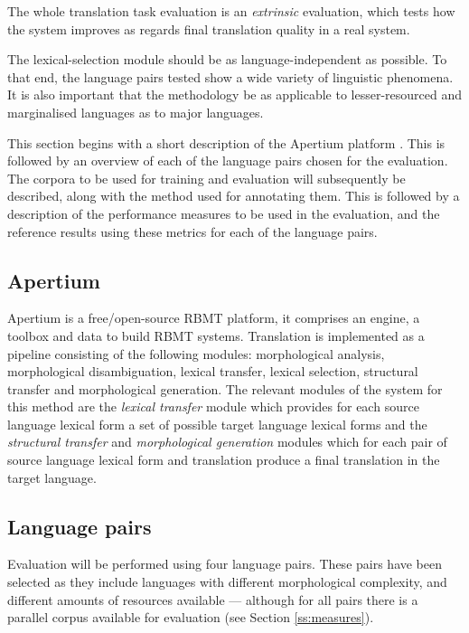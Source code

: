 \documentclass[11pt]{article}
\begin{document}
The
whole translation task evaluation is an \emph{extrinsic} evaluation, which
tests how the system improves as regards final translation
quality in a real system.

The lexical-selection module should be as language-independent as
possible. To that end, the language pairs tested show a wide
variety of linguistic phenomena. It is also important that the
methodology be as applicable to lesser-resourced and marginalised
languages as to major languages.

This section begins with a short description of the Apertium 
platform \citep{forcada2011apertium}. This is followed by 
an overview of each of the language
pairs chosen for the evaluation. The corpora to be used for training
and evaluation will subsequently be described, along with the method
used for annotating them. This is followed by a description of the
performance measures to be used in the evaluation, and the reference
results using these metrics for each of the language pairs.

\subsection{Apertium}
\label{sec:apertium}

Apertium is a free/open-source RBMT platform, it comprises an engine,
a toolbox and data to build RBMT systems. Translation is implemented
as a pipeline consisting of the following modules: morphological
analysis, morphological disambiguation, lexical transfer, lexical
selection, structural transfer and morphological generation. The
relevant modules of the system for this method are the \emph{lexical
  transfer} module which provides for each source language lexical
form a set of possible target language lexical forms and the
\emph{structural transfer} and \emph{morphological generation} modules
which for each pair of source language lexical form and translation
produce a final translation in the target language. 

\subsection{Language pairs}
\label{sec:eval-systems}

Evaluation will be performed using four language pairs. These pairs
have been selected as they include languages with different
morphological complexity, and different amounts of resources available
--- although for all pairs there is a parallel corpus available
for evaluation (see Section \ref{ss:measures}). 
\end{document}
